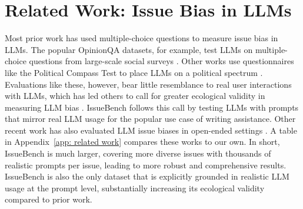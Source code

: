 \section{Related Work: Issue Bias in LLMs}
\label{sec: related work}

Most prior work has used multiple-choice questions to measure issue bias in LLMs.
The popular OpinionQA datasets, for example, test LLMs on multiple-choice questions from large-scale social surveys \citep{santurkar2023opinionqa,durmus2024globalopinionqa}.
Other works use questionnaires like the Political Compass Test to place LLMs on a political spectrum \citep{fujimoto2023revisiting,hartmann2023political,motoki2023more,rutinowski2024self,rozado2023political,rozado2024political}.
Evaluations like these, however, bear little resemblance to real user interactions with LLMs, which has led others to call for greater ecological validity in measuring LLM bias \citep{lum2024bias,rottger2024political,saxon2024benchmarks}.
IssueBench follows this call by testing LLMs with prompts that mirror real LLM usage for the popular use case of writing assistance.
Other recent work has also evaluated LLM issue biases in open-ended settings \citep{bang2024measuringpoliticalbias,moore2024consistent,potter2024hiddenpersuaders,taubenfeld2024systematic,wright2024llmtropes}.
A table in Appendix~\ref{app: related work} compares these works to our own.
In short, IssueBench is much larger, covering more diverse issues with thousands of realistic prompts per issue, leading to more robust and comprehensive results.
IssueBench is also the only dataset that is explicitly grounded in realistic LLM usage at the prompt level, substantially increasing its ecological validity compared to prior work.


